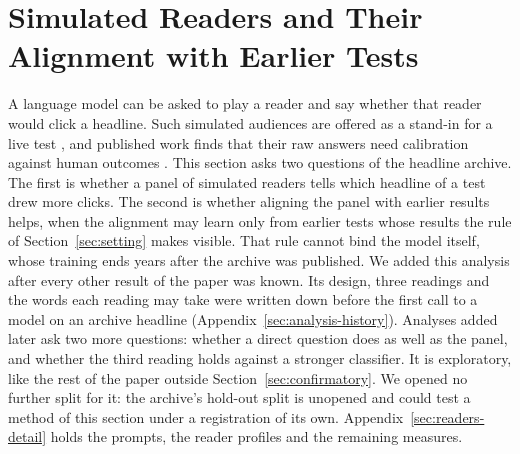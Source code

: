 \section{Simulated Readers and Their Alignment with Earlier Tests}
\label{sec:readers}
A language model can be asked to play a reader and say whether that reader would click a headline. Such simulated audiences are offered as a stand-in for a live test \cite{li2026simgym,hut2026can}, and published work finds that their raw answers need calibration against human outcomes \cite{persson2026statistical,ankargren2026when}. This section asks two questions of the headline archive. The first is whether a panel of simulated readers tells which headline of a test drew more clicks. The second is whether aligning the panel with earlier results helps, when the alignment may learn only from earlier tests whose results the rule of Section~\ref{sec:setting} makes visible. That rule cannot bind the model itself, whose training ends years after the archive was published. We added this analysis after every other result of the paper was known. Its design, three readings and the words each reading may take were written down before the first call to a model on an archive headline (Appendix~\ref{sec:analysis-history}). Analyses added later ask two more questions: whether a direct question does as well as the panel, and whether the third reading holds against a stronger classifier. It is exploratory, like the rest of the paper outside Section~\ref{sec:confirmatory}. We opened no further split for it: the archive's hold-out split is unopened and could test a method of this section under a registration of its own. Appendix~\ref{sec:readers-detail} holds the prompts, the reader profiles and the remaining measures.


